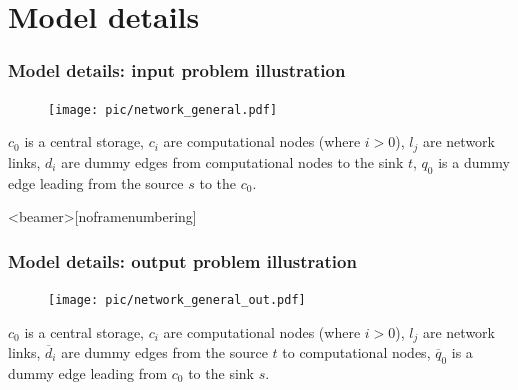 \documentclass{beamer}
\begin{document}
\section{Model details}
\begin{frame}\frametitle{Model details: input problem illustration}
\begin{figure}[h]
	\begin{center}
		\texttt{[image: pic/network\_general.pdf]}
	\end{center}

	\label{network_general}	
\end{figure} 
$c_{0}$ is a central storage, $c_{i}$ are computational nodes (where $i>0$), $l_{j}$ are network links, $d_{i}$ are dummy edges from computational nodes to the sink $t$, $q_{0}$ is a dummy edge leading from the source $s$ to the $c_{0}$. 
\end{frame}

\begin{frame}<beamer>[noframenumbering]\frametitle{Model details: output problem illustration}
\begin{figure}[h]
	\begin{center}
		\texttt{[image: pic/network\_general\_out.pdf]}
	\end{center}

	\label{general_out}	
\end{figure}
	$c_{0}$ is a central storage, $c_{i}$ are computational nodes (where $i>0$), $l_{j}$ are network links, $\overline{d}_{i}$ are dummy edges from the source $t$ to computational nodes, $\overline{q}_{0}$ is a dummy edge leading from $c_{0}$ to the sink $s$.
\end{frame}
\end{document}
